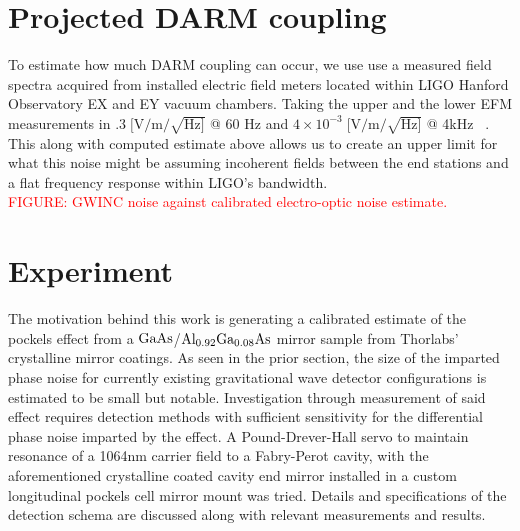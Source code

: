 \section{Projected DARM coupling}
To estimate how much DARM coupling can occur, we use use a measured field spectra acquired from installed electric field meters located within LIGO Hanford Observatory EX and EY vacuum chambers. Taking the upper and the lower EFM measurements in $.3\; [\mathrm{V}/\mathrm{m}/\sqrt{\mathrm{Hz}]}$ @ 60 Hz and $4\times10^{-3}\; [\mathrm{V}/\mathrm{m}/\sqrt{\mathrm{Hz}]}$ @ 4kHz ~\cite{efm_log}.
This along with computed estimate above allows us to create an upper limit for what this noise might be assuming incoherent fields between the end stations and a flat frequency response within LIGO's bandwidth.
\\
\textcolor{red}{FIGURE: GWINC noise against calibrated electro-optic noise estimate.}

\section{Experiment}
The motivation behind this work is generating a calibrated estimate of the pockels effect from a $\mathrm{GaAs}$/$\mathrm{Al_{0.92}Ga_{0.08}As}$ mirror sample from Thorlabs' crystalline mirror coatings. As seen in the prior section, the size of the imparted phase noise for currently existing gravitational wave detector configurations is estimated to be small but notable. Investigation through measurement of said effect requires detection methods with sufficient sensitivity for the differential phase noise imparted by the effect. A Pound-Drever-Hall servo to maintain resonance of a 1064nm carrier field to a Fabry-Perot cavity, with the aforementioned crystalline coated cavity end mirror installed in a custom longitudinal pockels cell mirror mount was tried. Details and specifications of the detection schema are discussed along with relevant measurements and results.

